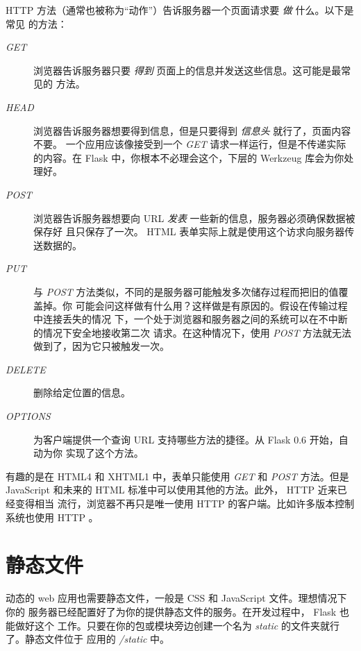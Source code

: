 \documentclass[a4paper,12pt]{sphinxmanual}
\begin{document}
HTTP 方法（通常也被称为“动作”）告诉服务器一个页面请求要 \emph{做} 什么。以下是常见
的方法：
\begin{description}
\item[{\emph{GET}}] \leavevmode
浏览器告诉服务器只要 \emph{得到} 页面上的信息并发送这些信息。这可能是最常见的
方法。

\item[{\emph{HEAD}}] \leavevmode
浏览器告诉服务器想要得到信息，但是只要得到 \emph{信息头} 就行了，页面内容不要。
一个应用应该像接受到一个 \emph{GET} 请求一样运行，但是不传递实际的内容。在
Flask 中，你根本不必理会这个，下层的 Werkzeug 库会为你处理好。

\item[{\emph{POST}}] \leavevmode
浏览器告诉服务器想要向 URL  \emph{发表} 一些新的信息，服务器必须确保数据被保存好
且只保存了一次。 HTML 表单实际上就是使用这个访求向服务器传送数据的。

\item[{\emph{PUT}}] \leavevmode
与 \emph{POST} 方法类似，不同的是服务器可能触发多次储存过程而把旧的值覆盖掉。你
可能会问这样做有什么用？这样做是有原因的。假设在传输过程中连接丢失的情况
下，一个处于浏览器和服务器之间的系统可以在不中断的情况下安全地接收第二次
请求。在这种情况下，使用 \emph{POST} 方法就无法做到了，因为它只被触发一次。

\item[{\emph{DELETE}}] \leavevmode
删除给定位置的信息。

\item[{\emph{OPTIONS}}] \leavevmode
为客户端提供一个查询 URL 支持哪些方法的捷径。从 Flask 0.6 开始，自动为你
实现了这个方法。

\end{description}

有趣的是在 HTML4 和 XHTML1 中，表单只能使用 \emph{GET} 和 \emph{POST} 方法。但是
JavaScript 和未来的 HTML 标准中可以使用其他的方法。此外， HTTP 近来已经变得相当
流行，浏览器不再只是唯一使用 HTTP 的客户端。比如许多版本控制系统也使用 HTTP 。


\section{静态文件}
\label{quickstart:http-rfc}\label{quickstart:id6}
动态的 web 应用也需要静态文件，一般是 CSS 和 JavaScript 文件。理想情况下你的
服务器已经配置好了为你的提供静态文件的服务。在开发过程中， Flask 也能做好这个
工作。只要在你的包或模块旁边创建一个名为 \emph{static} 的文件夹就行了。静态文件位于
应用的 \emph{/static} 中。
\end{document}
